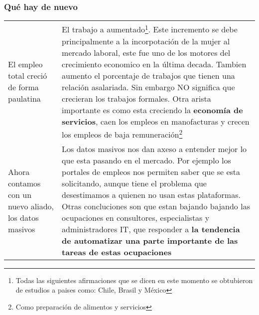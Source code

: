 \subsubsection{Qué hay de nuevo}

\begingroup
\setlength{\tabcolsep}{12pt} %
\renewcommand{\arraystretch}{1.5} %
\begin{tabular}{p{4cm}|p{11cm}}
El empleo total creció de forma paulatina& El trabajo a aumentado\footnote{Todas las siguientes afirmaciones que se dicen en este momento se obtubieron  de estudios a paises como: Chile, Brasil y México}. Este incremento se debe principalmente a la incorpotación de la mujer al mercado laboral, este fue uno de los motores del crecimiento economico en la última decada. Tambien aumento el porcentaje de trabajos que tienen una relación asalariada. Sin embargo NO significa que crecieran los trabajos formales. Otra arista importante es como esta creciendo la {\bf economía de servicios}, caen los empleos en manofacturas y crecen los empleos de baja remuneración\footnote{Como preparación de alimentos y servicios}\\
Ahora contamos con un nuevo aliado, los datos masivos&Los datos masivos nos dan axeso a entender mejor lo que esta pasando en el mercado. Por ejemplo los portales de empleos nos permiten saber que se esta solicitando, aunque tiene el problema que desestimamos a quienen no usan estas plataformas. Otras concluciones son que estan bajando bajando las ocupaciones en consultores, especialistas y administradores IT, que responder a {\bf la tendencia de automatizar una parte importante de las tareas de estas ocupaciones}\\
\end{tabular}
\endgroup


